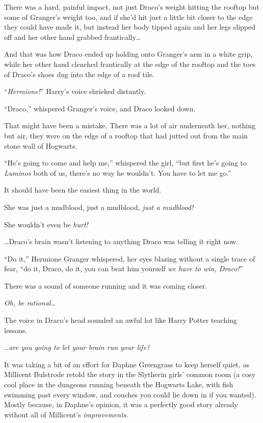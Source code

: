 There was a hard, painful impact, not just Draco’s weight hitting the rooftop but some of Granger’s weight too, and if she’d hit just a little bit closer to the edge they could have made it, but instead her body tipped again and her legs slipped off and her other hand grabbed frantically…

And that was how Draco ended up holding onto Granger’s arm in a white grip, while her other hand clenched frantically at the edge of the rooftop and the toes of Draco’s shoes dug into the edge of a roof tile.

“\emph{Hermione!}” Harry’s voice shrieked distantly.

“Draco,” whispered Granger’s voice, and Draco looked down.

That might have been a mistake. There was a lot of air underneath her, nothing but air, they were on the edge of a rooftop that had jutted out from the main stone wall of Hogwarts.

“He’s going to come and help me,” whispered the girl, “but first he’s going to \emph{Luminos} both of us, there’s no way he wouldn’t. You have to let me go.”

It should have been the easiest thing in the world.

She was just a mudblood, just a mudblood, \emph{just a mudblood!}

She wouldn’t even be \emph{hurt!}

…Draco’s brain wasn’t listening to anything Draco was telling it right now.

“Do it,” Hermione Granger whispered, her eyes blazing without a single trace of fear, “do it, Draco, do it, you can beat him yourself \emph{we have to win, Draco!}”

There was a sound of someone running and it was coming closer.

\emph{Oh, be rational…}

The voice in Draco’s head sounded an awful lot like Harry Potter teaching lessons.

…\emph{are you going to let your brain run your life?}


It was taking a bit of an effort for Daphne Greengrass to keep herself quiet, as Millicent Bulstrode retold the story in the Slytherin girls’ common room (a cosy cool place in the dungeons running beneath the Hogwarts Lake, with fish swimming past every window, and couches you could lie down in if you wanted). Mostly because, in Daphne’s opinion, it was a perfectly good story already without all of Millicent’s \emph{improvements}.

